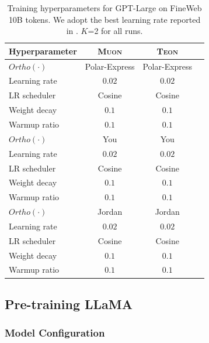 \documentclass{article}
\theoremstyle{plain}
\theoremstyle{definition}
\theoremstyle{remark}
\begin{document}
\begin{table}[htb]
\centering
\begin{tabular}{lccc}
\toprule
\textbf{Hyperparameter} & \textbf{\textsc{Muon}} & \textbf{\textsc{Teon}} \\
\midrule
$Ortho(\cdot)$        & Polar-Express & Polar-Express \\
Learning rate           & $0.02$ & $0.02$ \\
LR scheduler            & Cosine & Cosine \\
Weight decay            & $0.1$ & $0.1$ \\
Warmup ratio            & $0.1$ & $0.1$ \\
\midrule
$Ortho(\cdot)$       & You            & You            \\
Learning rate           & $0.02$ & $0.02$ \\
LR scheduler            & Cosine & Cosine \\
Weight decay            & $0.1$ & $0.1$ \\
Warmup ratio            & $0.1$ & $0.1$ \\
\midrule
$Ortho(\cdot)$        & Jordan         & Jordan         \\
Learning rate           & $0.02$ & $0.02$ \\
LR scheduler            & Cosine & Cosine \\
Weight decay            & $0.1$ & $0.1$ \\
Warmup ratio            & $0.1$ & $0.1$ \\
\bottomrule
\end{tabular}
\caption{Training hyperparameters for GPT-Large on FineWeb 10B tokens. We adopt the best learning rate reported in \cite{amsel2025polar}. $K$=2 for all runs.}
\label{tab:hparams_gpt_large}
\end{table}
\newpage

\subsection{Pre-training LLaMA}
\subsubsection{Model Configuration}
\end{document}
